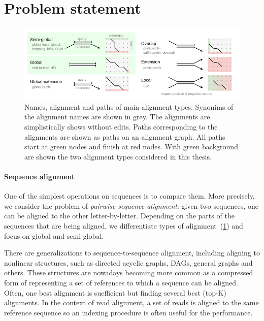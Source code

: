 \section*{Problem statement}

\begin{figure}[H]  %
    \includegraphics[width=\textwidth]{alignment-types-thesis.pdf}
	\caption[Main alignment types]{Names, alignment and paths of main alignment
    types. Synonims of the alignment names are shown in grey. The alignments are
    simplistically shows without edits. Paths corresponding to the alignments
    are shown as paths on an alignment graph. All paths start at green nodes and
    finish at red nodes. With green background are shown the two alignment types
    considered in this thesis.}
    \label{fig:alignment-types}
\end{figure}

\paragraph{Sequence alignment}
One of the simplest operations on sequences is to compare them. More precisely,
we consider the problem of \emph{pairwise sequence alignment}: given two
sequences, one can be aligned to the other letter-by-letter. Depending on the
parts of the sequences that are being aligned, we differentiate types of
alignment~(\cref{fig:alignment-types}) and focus on global and semi-global.

There are generalizations to sequence-to-sequence alignment, including aligning
to nonlinear structures, such as directed acyclic graphs, DAGs, general graphs
and others. These structures are nowadays becoming more common as a compressed
form of representing a set of references to which a sequence can be aligned.
Often, one best alignment is suefficient but finding several best (top-K)
alignments. In the context of read alignment, a set of reads is aligned to the
same reference sequence so an indexing procedure is often useful for the
performance.

